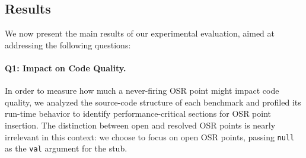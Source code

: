 \begin{description}
\subsection{Results}
We now present the main results of our experimental evaluation, aimed at addressing the following questions:

\paragraph{Q1: Impact on Code Quality.}
In order to measure how much a never-firing OSR point might impact code quality, we analyzed the source-code structure of each benchmark and profiled its run-time behavior to identify performance-critical sections for OSR point insertion. The distinction between open and resolved OSR points is nearly irrelevant in this context: we choose to focus on open OSR points, passing {\tt null} as the {\tt val} argument for the stub.


\end{description}
